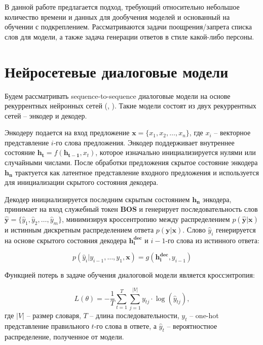 \documentclass[]{article}
\begin{document}
В данной работе предлагается подход, требующий относительно небольшое количество времени и данных для дообучения моделей и основанный на обучении с подкреплением. Рассматриваются задачи поощрения/запрета списка слов для модели, а также задача генерации ответов в стиле какой-либо персоны.

\section{Нейросетевые диалоговые модели}

Будем рассматривать sequence-to-sequence диалоговые модели на основе рекуррентных нейронных сетей (\cite{DBLP:journals/corr/LiGBGD16}, \cite{DBLP:journals/corr/VinyalsL15}). Такие модели состоят из двух рекуррентных сетей -- энкодер и декодер.

Энкодеру подается на вход предложение $\mathbf{x} = \lbrace x_1, x_2, \dots, x_n\rbrace$, где $x_i$ -- векторное представление $i$-го слова предложения. Энкодер поддерживает внутреннее состояние $\mathbf{h_t} = f(\mathbf{h_{t-1}}, x_t)$, которое изначально инициализируется нулями или случайными числами. После обработки предложения скрытое состояние энкодера $\mathbf{h_n}$ трактуется как латентное представление входного предложения и используется для инициализации скрытого состояния декодера.

Декодер инициализируется последним скрытым состоянием $\mathbf{h_n}$ энкодера, принимает на вход служебный токен $\textbf{BOS}$ и генерирует последовательность слов $\mathbf{\hat{y}} = \lbrace \hat{y}_1, \hat{y}_2, \dots, \hat{y}_m\rbrace$, минимизируя кроссентропию между распределением $p(\mathbf{\hat{y}} | \mathbf{x})$ и истинным дискретным распределением ответа $p(\mathbf{y} | \mathbf{x})$. Слово $\hat{y}_i$ генерируется на основе скрытого состояния декодера $\mathbf{h^{dec}_i}$ и $i-1$-го слова из истинного ответа:

\begin{equation}
p(\hat{y}_i | y_{i-1}, \dots, y_1, \mathbf{x}) = g(\mathbf{h^{dec}_i}, y_{i-1})
\end{equation}

Функцией потерь в задаче обучения диалоговой модели является кроссэнтропия:

\begin{equation}
\label{crossentropy}
L(\theta) =  -\frac{1}{T}\sum_{t=1}^{T}\sum_{j=1}^{|V|} y_{tj} \cdot \log(\hat{y}_{tj}),
\end{equation}
где $|V|$ -- размер словаря, $T$ -- длина последовательности, $y_{t}$ -- one-hot представление правильного $t$-го слова в ответе, а $\hat{y}_{t}$ -- вероятностное распределение, полученное от модели.
\end{document}

